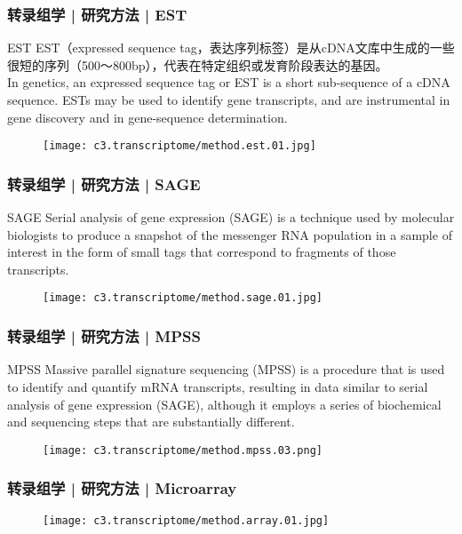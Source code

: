 \begin{frame}
  \frametitle{转录组学 | 研究方法 | EST}
  {\footnotesize
  \begin{block}{EST}
    EST（expressed sequence tag，表达序列标签）是从cDNA文库中生成的一些很短的序列（500～800bp），代表在特定组织或发育阶段表达的基因。\\
    \vspace{0.2em}
    In genetics, an expressed sequence tag or EST is a short sub-sequence of a cDNA sequence. ESTs may be used to identify gene transcripts, and are instrumental in gene discovery and in gene-sequence determination.
  \end{block}
  }
  \begin{figure}
    \centering
    \texttt{[image: c3.transcriptome/method.est.01.jpg]}
  \end{figure}
\end{frame}

\begin{frame}
  \frametitle{转录组学 | 研究方法 | SAGE}
  \begin{block}{SAGE}
    Serial analysis of gene expression (SAGE) is a technique used by molecular biologists to produce a snapshot of the messenger RNA population in a sample of interest in the form of small tags that correspond to fragments of those transcripts.
  \end{block}
  \begin{figure}
    \centering
    \texttt{[image: c3.transcriptome/method.sage.01.jpg]}
  \end{figure}
\end{frame}

\begin{frame}
  \frametitle{转录组学 | 研究方法 | MPSS}
  {\footnotesize
  \begin{block}{MPSS}
    Massive parallel signature sequencing (MPSS) is a procedure that is used to identify and quantify mRNA transcripts, resulting in data similar to serial analysis of gene expression (SAGE), although it employs a series of biochemical and sequencing steps that are substantially different.
  \end{block}
  }
  \begin{figure}
    \centering
    \texttt{[image: c3.transcriptome/method.mpss.03.png]}
  \end{figure}
\end{frame}

\begin{frame}
  \frametitle{转录组学 | 研究方法 | Microarray}
  \begin{figure}
    \centering
    \texttt{[image: c3.transcriptome/method.array.01.jpg]}
  \end{figure}
\end{frame}

